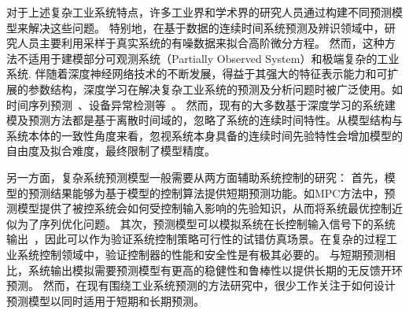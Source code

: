 对于上述复杂工业系统特点，许多工业界和学术界的研究人员通过构建不同预测模型来解决这些问题。
特别地，在基于数据的连续时间系统预测及辨识领域中，研究人员主要利用采样于真实系统的有噪数据来拟合高阶微分方程。
然而，这种方法不适用于建模部分可观测系统（Partially Observed System）和极端复杂的工业系统.
伴随着深度神经网络技术的不断发展，得益于其强大的特征表示能力和可扩展的参数结构，深度学习在解决复杂工业系统的预测及分析问题时被广泛使用。如时间序列预测~\cite{Member2019,Essien2020,9161367,9522017,neu2021systematic}、设备异常检测等~\cite{9326384}。
然而，现有的大多数基于深度学习的系统建模及预测方法都是基于离散时间域的，忽略了系统的连续时间特性。从模型结构与系统本体的一致性角度来看，忽视系统本身具备的连续时间先验特性会增加模型的自由度及拟合难度，最终限制了模型精度。

另一方面，复杂系统预测模型一般需要从两方面辅助系统控制的研究：
首先，模型的预测结果能够为基于模型的控制算法提供短期预测功能。如MPC方法中，预测模型提供了被控系统会如何受控制输入影响的先验知识，从而将系统最优控制近似为了序列优化问题。
其次，预测模型可以模拟系统在长控制输入信号下的系统输出~\cite{Demeester2020SystemIW}，因此可以作为验证系统控制策略可行性的试错仿真场景。在复杂的过程工业系统控制领域中，验证控制器的性能和安全性是有极其必要的。
与短期预测相比，系统输出模拟需要预测模型有更高的稳健性和鲁棒性以提供长期的无反馈开环预测。
然而，在现有围绕工业系统预测的方法研究中，很少工作关注于如何设计预测模型以同时适用于短期和长期预测。

